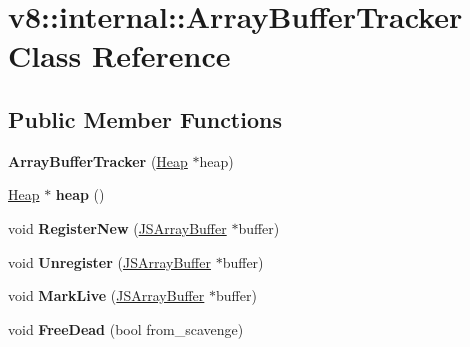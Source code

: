 \hypertarget{classv8_1_1internal_1_1_array_buffer_tracker}{}\section{v8\+:\+:internal\+:\+:Array\+Buffer\+Tracker Class Reference}
\label{classv8_1_1internal_1_1_array_buffer_tracker}
\subsection*{Public Member Functions}
\begin{DoxyCompactItemize}
\item 
{\bfseries Array\+Buffer\+Tracker} (\hyperlink{classv8_1_1internal_1_1_heap}{Heap} $\ast$heap)\hypertarget{classv8_1_1internal_1_1_array_buffer_tracker_a6809e66763ac50ced74836a6983ef2be}{}\label{classv8_1_1internal_1_1_array_buffer_tracker_a6809e66763ac50ced74836a6983ef2be}

\item 
\hyperlink{classv8_1_1internal_1_1_heap}{Heap} $\ast$ {\bfseries heap} ()\hypertarget{classv8_1_1internal_1_1_array_buffer_tracker_a692c236a3192997f0e0e19aeabccc36c}{}\label{classv8_1_1internal_1_1_array_buffer_tracker_a692c236a3192997f0e0e19aeabccc36c}

\item 
void {\bfseries Register\+New} (\hyperlink{classv8_1_1internal_1_1_j_s_array_buffer}{J\+S\+Array\+Buffer} $\ast$buffer)\hypertarget{classv8_1_1internal_1_1_array_buffer_tracker_acc2e15caf873dfcfbe2b5c8671f2db92}{}\label{classv8_1_1internal_1_1_array_buffer_tracker_acc2e15caf873dfcfbe2b5c8671f2db92}

\item 
void {\bfseries Unregister} (\hyperlink{classv8_1_1internal_1_1_j_s_array_buffer}{J\+S\+Array\+Buffer} $\ast$buffer)\hypertarget{classv8_1_1internal_1_1_array_buffer_tracker_a778fb04c482ab51395aaf9d08e74e156}{}\label{classv8_1_1internal_1_1_array_buffer_tracker_a778fb04c482ab51395aaf9d08e74e156}

\item 
void {\bfseries Mark\+Live} (\hyperlink{classv8_1_1internal_1_1_j_s_array_buffer}{J\+S\+Array\+Buffer} $\ast$buffer)\hypertarget{classv8_1_1internal_1_1_array_buffer_tracker_a2278d3154147a26ab90fed6e01241a89}{}\label{classv8_1_1internal_1_1_array_buffer_tracker_a2278d3154147a26ab90fed6e01241a89}

\item 
void {\bfseries Free\+Dead} (bool from\+\_\+scavenge)\hypertarget{classv8_1_1internal_1_1_array_buffer_tracker_af2b171c002d0cfcad566921abebe1f40}{}\label{classv8_1_1internal_1_1_array_buffer_tracker_af2b171c002d0cfcad566921abebe1f40}


\end{DoxyCompactItemize}
